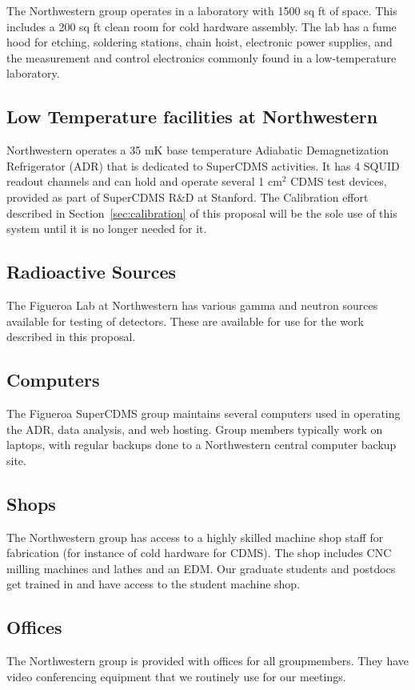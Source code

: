 The Northwestern group operates in a laboratory with 1500 sq ft of space. This includes a 200 sq ft clean room for cold hardware assembly. The lab has a fume hood for etching, soldering stations, chain hoist, electronic power supplies, and the measurement and control electronics commonly found in a low-temperature laboratory.

\subsection{Low Temperature facilities at Northwestern}
Northwestern operates a 35 mK base temperature Adiabatic Demagnetization Refrigerator (ADR) that is dedicated to SuperCDMS activities. It has 4 SQUID readout channels and can hold and operate several 1 cm$^2$ CDMS test devices, provided as part of SuperCDMS R\&D at Stanford. The Calibration effort described in Section~\ref{sec:calibration} of this proposal will be the sole use of this system until it is no longer needed for it.

\subsection{Radioactive Sources}
The Figueroa Lab at Northwestern has various gamma and neutron sources available for testing of detectors. These are available for use for the work described in this proposal.

\subsection{Computers}
The Figueroa SuperCDMS group maintains several computers used in operating the ADR, data analysis, and web hosting.
Group members typically work on laptops, with regular backups done to a Northwestern central computer backup site.

\subsection{Shops}
The Northwestern group has access to a highly skilled machine shop staff for fabrication (for instance of cold hardware for CDMS). The shop includes CNC milling machines and lathes and an EDM. Our graduate students and postdocs get trained in and have access to the student machine shop.

\subsection{Offices}
The Northwestern group is provided with offices for all groupmembers. They have video conferencing equipment that we routinely use for our meetings. 

